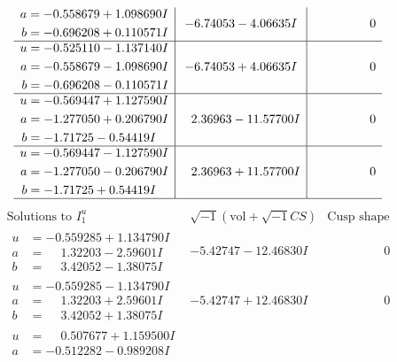 \documentclass[1p]{elsarticle_modified}
\theoremstyle{definition}
\newcommand{\I}{\sqrt{-1}}
\begin{document}
$$\begin{array}{c|c|c}
\begin{aligned}
a &= -0.558679 + 1.098690 I \\
b &= -0.696208 + 0.110571 I\end{aligned}
 & -6.74053 - 4.06635 I & \phantom{-0.000000 } 0 \\ \hline\begin{aligned}
u &= -0.525110 - 1.137140 I \\
a &= -0.558679 - 1.098690 I \\
b &= -0.696208 - 0.110571 I\end{aligned}
 & -6.74053 + 4.06635 I & \phantom{-0.000000 } 0 \\ \hline\begin{aligned}
u &= -0.569447 + 1.127590 I \\
a &= -1.277050 + 0.206790 I \\
b &= -1.71725 - 0.54419 I\end{aligned}
 & \phantom{-}2.36963 - 11.57700 I & \phantom{-0.000000 } 0 \\ \hline\begin{aligned}
u &= -0.569447 - 1.127590 I \\
a &= -1.277050 - 0.206790 I \\
b &= -1.71725 + 0.54419 I\end{aligned}
 & \phantom{-}2.36963 + 11.57700 I & \phantom{-0.000000 } 0\\
 \hline 
 \end{array}$$\newpage$$\begin{array}{c|c|c}  
\text{Solutions to }I^u_{1}& \I (\text{vol} + \sqrt{-1}CS) & \text{Cusp shape}\\
 \hline 
\begin{aligned}
u &= -0.559285 + 1.134790 I \\
a &= \phantom{-}1.32203 - 2.59601 I \\
b &= \phantom{-}3.42052 - 1.38075 I\end{aligned}
 & -5.42747 - 12.46830 I & \phantom{-0.000000 } 0 \\ \hline\begin{aligned}
u &= -0.559285 - 1.134790 I \\
a &= \phantom{-}1.32203 + 2.59601 I \\
b &= \phantom{-}3.42052 + 1.38075 I\end{aligned}
 & -5.42747 + 12.46830 I & \phantom{-0.000000 } 0 \\ \hline\begin{aligned}
u &= \phantom{-}0.507677 + 1.159500 I \\
a &= -0.512282 - 0.989208 I \\

\end{aligned}
\end{array}$$
\end{document}
